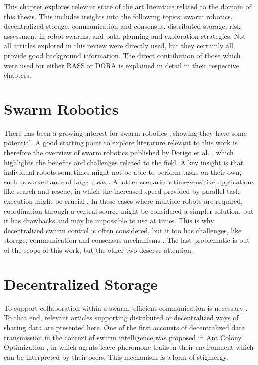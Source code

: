 \label{sec:RevLitt}
This chapter explores relevant state of the art literature related to the domain of this thesis. This includes insights into the following topics: swarm robotics, decentralized storage, communication and consensus, distributed storage, risk assessment in robot swarms, and path planning and exploration strategies. Not all articles explored in this review were directly used, but they certainly all provide good background information. The direct contribution of those which were used for either \ac{RASS} or \ac{DORA} is explained in detail in their respective chapters.

\section{Swarm Robotics}
There has been a growing interest for swarm robotics \cite{dorigo2020reflections,yang2018grand}, showing they have some potential. A good starting point to explore literature relevant to this work is therefore the overview of swarm robotics published by Dorigo et al. \cite{dorigo2021swarm}, which highlights the benefits and challenges related to the field. A key insight is that individual robots sometimes might not be able to perform tasks on their own, such as surveillance of large areas \cite{renzaglia2012multi}. Another scenario is time-sensitive applications like search and rescue, in which the increased speed provided by parallel task execution might be crucial \cite{mcguireMinimalNavigationSolution2019a}. In these cases where multiple robots are required, coordination through a central source might be considered a simpler solution, but it has drawbacks and may be impossible to use at times. This is why decentralized swarm control is often considered, but it too has challenges, like storage, communication and consensus mechanisms \cite{davis2016consensus}. The last problematic is out of the scope of this work, but the other two deserve attention.

\section{Decentralized Storage}
To support collaboration within a swarm, efficient communication is necessary \cite{dutta2020efficient}. To that end, relevant articles supporting distributed or decentralized ways of sharing data are presented here. One of the first accounts of decentralized data transmission in the context of swarm intelligence was proposed in Ant Colony Optimization \cite{dorigo2006ant}, in which agents leave pheromone trails in their environment which can be interpreted by their peers. This mechanism is a form of stigmergy.

